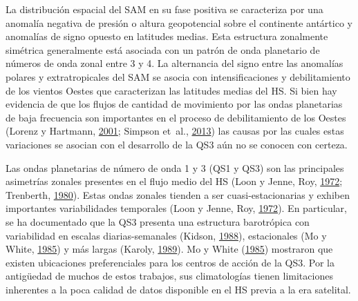 \documentclass[spanish,a4paper,12pt]{book}
\begin{document}
La distribución espacial del SAM en su fase positiva se caracteriza por
una anomalía negativa de presión o altura geopotencial sobre el
continente antártico y anomalías de signo opuesto en latitudes medias.
Esta estructura zonalmente simétrica generalmente está asociada con un
patrón de onda planetario de números de onda zonal entre 3 y 4. La
alternancia del signo entre las anomalías polares y extratropicales del
SAM se asocia con intensificaciones y debilitamiento de los vientos
Oestes que caracterizan las latitudes medias del HS. Si bien hay
evidencia de que los flujos de cantidad de movimiento por las ondas
planetarias de baja frecuencia son importantes en el proceso de
debilitamiento de los Oestes (Lorenz y Hartmann,
\protect\hyperlink{ref-Lorenz2001}{2001}; Simpson et~al.,
\protect\hyperlink{ref-Simpson2013}{2013}) las causas por las cuales
estas variaciones se asocian con el desarrollo de la QS3 aún no se
conocen con certeza.

Las ondas planetarias de número de onda 1 y 3 (QS1 y QS3) son las
principales asimetrías zonales presentes en el flujo medio del HS (Loon
y Jenne, Roy, \protect\hyperlink{ref-Loon1972}{1972}; Trenberth,
\protect\hyperlink{ref-Trenberth1980a}{1980}). Estas ondas zonales
tienden a ser cuasi-estacionarias y exhiben importantes variabilidades
temporales (Loon y Jenne, Roy, \protect\hyperlink{ref-Loon1972}{1972}).
En particular, se ha documentado que la QS3 presenta una estructura
barotrópica con variabilidad en escalas diarias-semanales (Kidson,
\protect\hyperlink{ref-Kidson1988}{1988}), estacionales (Mo y White,
\protect\hyperlink{ref-Mo1985}{1985}) y más largas (Karoly,
\protect\hyperlink{ref-Karoly1989}{1989}). Mo y White
(\protect\hyperlink{ref-Mo1985}{1985}) mostraron que existen ubicaciones
preferenciales para los centros de acción de la QS3. Por la antigüedad
de muchos de estos trabajos, sus climatologías tienen limitaciones
inherentes a la poca calidad de datos disponible en el HS previa a la
era satelital.
\end{document}
